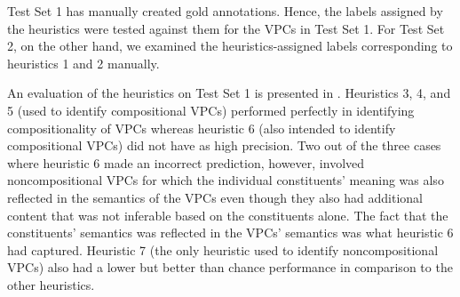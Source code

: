 \documentclass[output=paper,modfonts,nonflat]{langsci/langscibook}
\begin{document}
Test Set 1 has manually created gold annotations. Hence, the labels assigned by the heuristics were tested against them 
for the VPCs in Test Set 1. For Test Set 2, on the other hand, we examined the heuristics-assigned labels corresponding to heuristics 1 and 2 manually. 
 

An evaluation of the heuristics on Test Set 1 is presented in . Heuristics 3, 4, and 5 (used to identify compositional VPCs) performed perfectly in identifying compositionality of VPCs whereas heuristic 6 (also intended to identify compositional VPCs) did not have as high precision. Two out of the three cases where heuristic 6 made an incorrect prediction, however, involved noncompositional VPCs for which the individual constituents' meaning was also reflected in the semantics of the VPCs even though they also had additional content that was not inferable based on the constituents alone. The fact that the constituents' semantics was reflected in the VPCs' semantics was what heuristic 6 had captured. Heuristic 7 (the only heuristic used to identify noncompositional VPCs) also had a lower but better than chance performance in comparison to the other heuristics. 


\begin{table}
\caption[Evaluation of heuristics 3--7 using Test Set 1 (50 test cases)]{Evaluation of heuristics 3--7 using Test Set 1 (50 test cases)\footnote{We define precision as Cn/Tn and coverage as Tn/N, where N is the corpus size, Tn is the sample size that heuristic n is applicable to, and Cn is the number of correct assignments it makes.}}
\label{tab:1:eval-heur}
\end{table}
\end{document}

